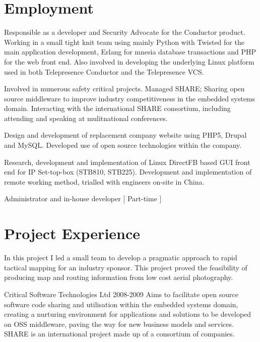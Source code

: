 \documentclass[overlapped,line,letterpaper]{res}
\begin{document}
\begin{resume}
\section{\bf Employment}
{
    Responsible as a developer and Security Advocate for the Conductor product.
    Working in a small tight knit team using mainly Python with Twisted for
    the main application development, Erlang for mnesia database transactions
    and PHP for the web front end.
    Also involved in developing the underlying Linux platform used in both
    Telepresence Conductor and the Telepresence VCS.
}

{
    Involved in numerous safety critical projects. Managed SHARE;
    Sharing open source middleware to improve industry competitiveness
    in the embedded systems domain. Interacting with the international SHARE
    consortium, including attending and speaking at mulitnational conferences.
}

{
    Design and development of replacement company website using PHP5, Drupal and
    MySQL.
    Developed use of open source technologies within the company.
}

{
    Research, development and implementation of Linux DirectFB based GUI front end
    for IP Set-top-box (STB810, STB225). Development and implementation of remote
    working method, trialled with engineers on-site in China.
}

{
    Administrator and in-house developer [ Part-time ]
}


\section{\bf Project Experience}
{
    In this project I led a small team to develop a pragmatic approach to rapid
    tactical mapping for an industry sponsor.
    This project proved the feasibility of producing map and routing information
    from low cost aerial photography.
}

  {Critical Software Technologies Ltd}
  {2008-2009}
{
    Aims to facilitate open source software code sharing and utilisation within
    the embedded systems domain, creating a nurturing environment for
    applications and solutions to be developed on OSS middleware, paving the way
    for new business models and services.
    SHARE is an international project made up of a consortium of companies.
}


\end{resume}
\end{document}
